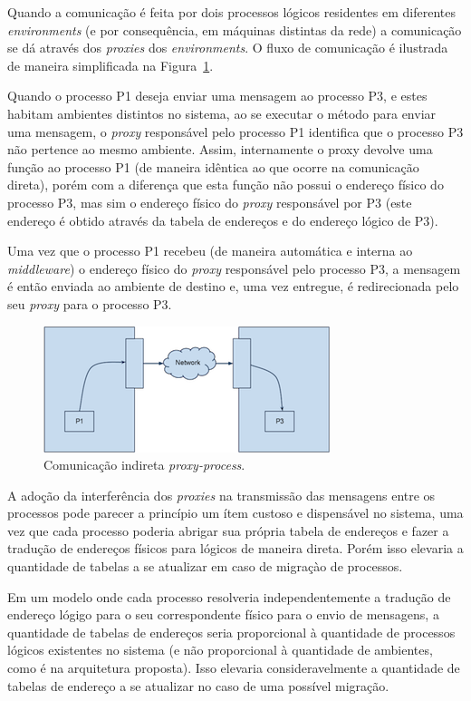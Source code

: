 Quando a comunicação é feita por dois processos lógicos residentes em diferentes \textit{environments} (e por consequência, em máquinas distintas da rede) a comunicação se dá através dos \textit{proxies} dos \textit{environments}. O fluxo de comunicação é ilustrada de maneira simplificada na Figura~\ref{fig:indireta}.

Quando o processo P1 deseja enviar uma mensagem ao processo P3, e estes habitam ambientes distintos no sistema, ao se executar o método para enviar uma mensagem, o \textit{proxy} responsável pelo processo P1 identifica que o processo P3 não pertence ao mesmo ambiente. Assim, internamente o proxy devolve uma função ao processo P1 (de maneira idêntica ao que ocorre na comunicação direta), porém com a diferença que esta função não possui o endereço físico do processo P3, mas sim o endereço físico do \textit{proxy} responsável por P3 (este endereço é obtido através da tabela de endereços e do endereço lógico de P3).

Uma vez que o processo P1 recebeu (de maneira automática e interna ao \textit{middleware}) o endereço físico do \textit{proxy} responsável pelo processo P3, a mensagem é então enviada ao ambiente de destino e, uma vez entregue, é redirecionada pelo seu \textit{proxy} para o processo P3.

\begin{figure}
  \centerline{\includegraphics{Communication_indireta.png}}
  \caption{Comunicação indireta \textit{proxy-process}.}
\label{fig:indireta}
\end{figure}

A adoção da interferência dos \textit{proxies} na transmissão das mensagens entre os processos pode parecer a princípio um ítem custoso e dispensável no sistema, uma vez que cada processo poderia abrigar sua própria tabela de endereços e fazer a tradução de endereços físicos para lógicos de maneira direta. Porém isso elevaria a quantidade de tabelas a se atualizar em caso de migraçào de processos.

Em um modelo onde cada processo resolveria independentemente a tradução de endereço lógigo para o seu correspondente físico para o envio de mensagens, a quantidade de tabelas de endereços seria proporcional à quantidade de processos lógicos existentes no sistema (e não proporcional à quantidade de ambientes, como é na arquitetura proposta). Isso elevaria consideravelmente a quantidade de tabelas de endereço a se atualizar no caso de uma possível migração.

